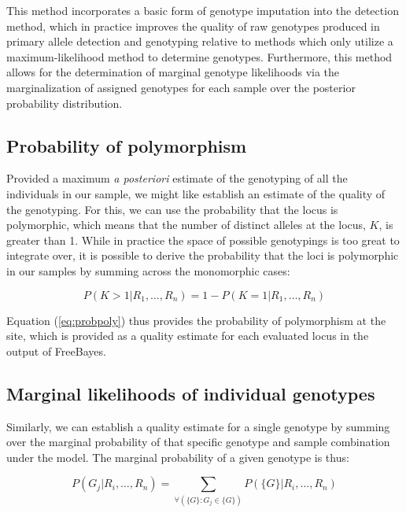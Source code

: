 \documentclass{article}
\begin{document}
This method incorporates a basic form of genotype imputation into the detection method, which in practice improves the quality of raw genotypes produced in primary allele detection and genotyping relative to methods which only utilize a maximum-likelihood method to determine genotypes.  Furthermore, this method allows for the determination of marginal genotype likelihoods via the marginalization of assigned genotypes for each sample over the posterior probability distribution.

\subsection{Probability of polymorphism}

Provided a maximum \emph{a posteriori} estimate of the genotyping of all the individuals in our sample, we might like establish an estimate of the quality of the genotyping.  For this, we can use the probability that the locus is polymorphic, which means that the number of distinct alleles at the locus, $K$, is greater than 1.  While in practice the space of possible genotypings is too great to integrate over, it is possible to derive the probability that the loci is polymorphic in our samples by summing across the monomorphic cases:

\begin{equation}
\label{eq:probpoly}
P(K > 1 | R_1,\ldots,R_n)
=
1 - P(K = 1 | R_1,\ldots,R_n)
\end{equation}

Equation (\ref{eq:probpoly}) thus provides the probability of polymorphism at the site, which is provided as a quality estimate for each evaluated locus in the output of FreeBayes.

\subsection{Marginal likelihoods of individual genotypes}

Similarly, we can establish a quality estimate for a single genotype by summing over the marginal probability of that specific genotype and sample combination under the model.  The marginal probability of a given genotype is thus:

\begin{equation}
\label{eq:marginals}
P(G_j|R_i,\ldots,R_n)
=
\sum_{\forall(\{G\} : G_j \in \{G\})}
P(\{G\}|R_i,\ldots,R_n)
\end{equation}
\end{document}
